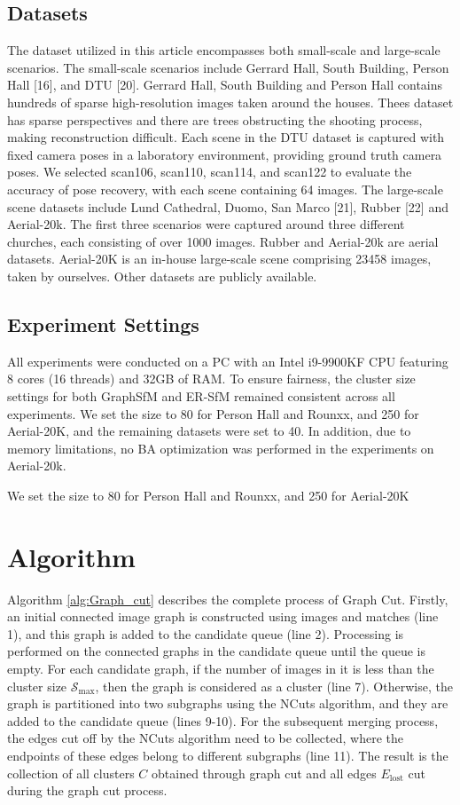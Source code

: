 \documentclass[runningheads]{llncs}
\begin{document}
\subsection{Datasets}
The dataset utilized in this article encompasses both small-scale and large-scale scenarios. The small-scale scenarios include Gerrard Hall, South Building, Person Hall [16], and DTU [20]. Gerrard Hall, South Building and Person Hall contains hundreds of sparse high-resolution images taken around the houses. Thees dataset has sparse perspectives and there are trees obstructing the shooting process, making reconstruction difficult. Each scene in the DTU dataset is captured with fixed camera poses in a laboratory environment, providing ground truth camera poses. We selected scan106, scan110, scan114, and scan122 to evaluate the  accuracy of pose recovery, with each scene containing 64 images. The large-scale scene datasets include Lund Cathedral, Duomo, San Marco [21], Rubber [22] and Aerial-20k. The first three scenarios were captured around three different churches, each consisting of over 1000 images. Rubber and Aerial-20k are aerial datasets. Aerial-20K is an in-house large-scale scene comprising 23458 images, taken by ourselves. Other datasets are publicly available.

\subsection{Experiment Settings}
All experiments were conducted on a PC with an Intel i9-9900KF CPU featuring 8 cores (16 threads) and 32GB of RAM. To ensure fairness, the cluster size settings for both GraphSfM and ER-SfM remained consistent across all experiments. We set the size to 80 for Person Hall and Rounxx, and 250 for Aerial-20K, and the remaining datasets were set to 40. In addition, due to memory limitations, no BA optimization was performed in the experiments on Aerial-20k.

We set the size to 80 for Person Hall and Rounxx, and 250 for Aerial-20K

\section{Algorithm}
Algorithm \ref{alg:Graph_cut} describes the complete process of Graph Cut. Firstly, an initial connected image graph is constructed using images and matches (line 1), and this graph is added to the candidate queue (line 2). Processing is performed on the connected graphs in the candidate queue until the queue is empty. For each candidate graph, if the number of images in it is less than the cluster size $\mathcal{S}_{\text{max}}$, then the graph is considered as a cluster (line 7). Otherwise, the graph is partitioned into two subgraphs using the NCuts algorithm, and they are added to the candidate queue (lines 9-10). For the subsequent merging process, the edges cut off by the NCuts algorithm need to be collected, where the endpoints of these edges belong to different subgraphs (line 11). The result is the collection of all clusters $C$ obtained through graph cut and all edges $E_{\text{lost}}$ cut during the graph cut process.
\end{document}
